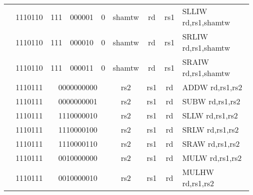 \begin{table}[p]
\begin{small}
\begin{center}
\begin{tabular}{rcccccccccl}
&
\multicolumn{1}{|c|}{1110110} &
\multicolumn{2}{c|}{111} &
\multicolumn{2}{c|}{000001} &
\multicolumn{1}{c|}{0} &
\multicolumn{1}{c|}{shamtw} &
\multicolumn{1}{c|}{rd} &
\multicolumn{1}{c|}{rs1} & SLLIW rd,rs1,shamtw \\
\cline{2-10}
  

&
\multicolumn{1}{|c|}{1110110} &
\multicolumn{2}{c|}{111} &
\multicolumn{2}{c|}{000010} &
\multicolumn{1}{c|}{0} &
\multicolumn{1}{c|}{shamtw} &
\multicolumn{1}{c|}{rd} &
\multicolumn{1}{c|}{rs1} & SRLIW rd,rs1,shamtw \\
\cline{2-10}
  

&
\multicolumn{1}{|c|}{1110110} &
\multicolumn{2}{c|}{111} &
\multicolumn{2}{c|}{000011} &
\multicolumn{1}{c|}{0} &
\multicolumn{1}{c|}{shamtw} &
\multicolumn{1}{c|}{rd} &
\multicolumn{1}{c|}{rs1} & SRAIW rd,rs1,shamtw \\
\cline{2-10}
  

&
\multicolumn{1}{|c|}{1110111} &
\multicolumn{5}{c|}{0000000000} &
\multicolumn{1}{c|}{rs2} &
\multicolumn{1}{c|}{rs1} &
\multicolumn{1}{c|}{rd} & ADDW rd,rs1,rs2 \\
\cline{2-10}
  

&
\multicolumn{1}{|c|}{1110111} &
\multicolumn{5}{c|}{0000000001} &
\multicolumn{1}{c|}{rs2} &
\multicolumn{1}{c|}{rs1} &
\multicolumn{1}{c|}{rd} & SUBW rd,rs1,rs2 \\
\cline{2-10}
  

&
\multicolumn{1}{|c|}{1110111} &
\multicolumn{5}{c|}{1110000010} &
\multicolumn{1}{c|}{rs2} &
\multicolumn{1}{c|}{rs1} &
\multicolumn{1}{c|}{rd} & SLLW rd,rs1,rs2 \\
\cline{2-10}
  

&
\multicolumn{1}{|c|}{1110111} &
\multicolumn{5}{c|}{1110000100} &
\multicolumn{1}{c|}{rs2} &
\multicolumn{1}{c|}{rs1} &
\multicolumn{1}{c|}{rd} & SRLW rd,rs1,rs2 \\
\cline{2-10}
  

&
\multicolumn{1}{|c|}{1110111} &
\multicolumn{5}{c|}{1110000110} &
\multicolumn{1}{c|}{rs2} &
\multicolumn{1}{c|}{rs1} &
\multicolumn{1}{c|}{rd} & SRAW rd,rs1,rs2 \\
\cline{2-10}
  

&
\multicolumn{1}{|c|}{1110111} &
\multicolumn{5}{c|}{0010000000} &
\multicolumn{1}{c|}{rs2} &
\multicolumn{1}{c|}{rs1} &
\multicolumn{1}{c|}{rd} & MULW rd,rs1,rs2 \\
\cline{2-10}
  

&
\multicolumn{1}{|c|}{1110111} &
\multicolumn{5}{c|}{0010000010} &
\multicolumn{1}{c|}{rs2} &
\multicolumn{1}{c|}{rs1} &
\multicolumn{1}{c|}{rd} & MULHW rd,rs1,rs2 \\
\cline{2-10}
  


\end{tabular}
\end{center}
\end{small}
\end{table}
